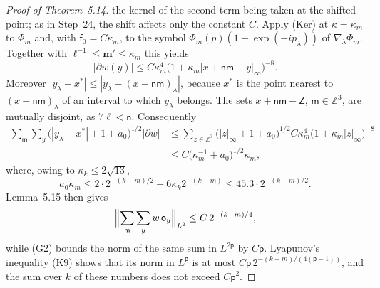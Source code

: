 \documentclass[11pt,letterpaper,reqno]{amsart}
\theoremstyle{definition}
\begin{document}
\begin{proof}[Proof of Theorem~5.14]
the kernel of the second term being taken at the shifted point; as in Step~24, the shift affects only the constant $C$.
Apply (Ker) at $\kappa=\kappa_m$ to $\Phi_m$ and, with $\mathsf f_0=C\kappa_m$, to the symbol $\Phi_m(p)(1-\exp(\mp ip_\lambda))$ of $\nabla_\lambda\Phi_m$.
Together with $\ell^{-1}\le\mathbf m'\le\kappa_m$ this yields
\begin{equation*}
|\partial w(y)|\le C\kappa_m^4\bigl(1+\kappa_m|x+\mathsf n\mathsf m-y|_\infty\bigr)^{-8}.
\end{equation*}
Moreover $|y_\lambda-x^*|\le|y_\lambda-(x+\mathsf n\mathsf m)_\lambda|$, because $x^*$ is the point nearest to $(x+\mathsf n\mathsf m)_\lambda$ of an interval to which $y_\lambda$ belongs.
The sets $x+\mathsf n\mathsf m-\mathsf Z$, $\mathsf m\in\mathbb Z^3$, are mutually disjoint, as $7\ell<\mathsf n$.
Consequently
\begin{equation*}
\begin{split}
\sum_{\mathsf m}\sum_y\bigl(|y_\lambda-x^*|+1+a_0\bigr)^{1/2}|\partial w|&\le\sum_{z\in\mathbb Z^3}\bigl(|z|_\infty+1+a_0\bigr)^{1/2}C\kappa_m^4\bigl(1+\kappa_m|z|_\infty\bigr)^{-8}\\
&\le C\bigl(\kappa_m^{-1}+a_0\bigr)^{1/2}\kappa_m,
\end{split}
\end{equation*}
where, owing to $\kappa_k\le2\sqrt{13}$,
\begin{equation*}
a_0\kappa_m\le2\cdot2^{-(k-m)/2}+6\kappa_k2^{-(k-m)}\le45.3\cdot2^{-(k-m)/2}.
\end{equation*}
Lemma~5.15 then gives
\begin{equation*}
\Bigl\|\sum_{\mathsf m}\sum_yw\,\mathsf o_y\Bigr\|_{L^2}\le C\,2^{-(k-m)/4},
\end{equation*}
while (G2) bounds the norm of the same sum in $L^{2\mathsf p}$ by $C\mathsf p$.
Lyapunov's inequality (K9) shows that its norm in $L^{\mathsf p}$ is at most $C\mathsf p\,2^{-(k-m)/(4(\mathsf p-1))}$, and the sum over $k$ of these numbers does not exceed $C\mathsf p^2$.


\end{proof}
\end{document}
